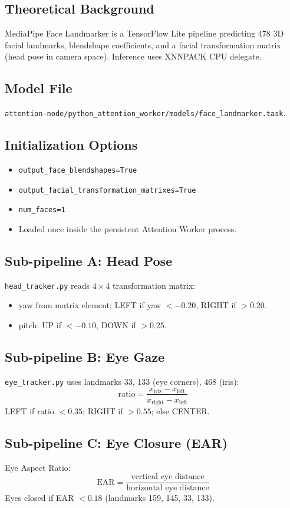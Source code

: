 \documentclass[11pt,a4paper]{report}
\begin{document}
\subsection{Theoretical Background}
MediaPipe Face Landmarker is a TensorFlow Lite pipeline predicting 478 3D facial landmarks, blendshape coefficients, and a facial transformation matrix (head pose in camera space). Inference uses XNNPACK CPU delegate.

\subsection{Model File}
\texttt{attention-node/python\_attention\_worker/models/face\_landmarker.task}.

\subsection{Initialization Options}
\begin{itemize}
  \item \texttt{output\_face\_blendshapes=True}
  \item \texttt{output\_facial\_transformation\_matrixes=True}
  \item \texttt{num\_faces=1}
  \item Loaded once inside the persistent Attention Worker process.
\end{itemize}

\subsection{Sub-pipeline A: Head Pose}
\texttt{head\_tracker.py} reads $4 \times 4$ transformation matrix:
\begin{itemize}
  \item yaw from matrix element; LEFT if yaw $< -0.20$, RIGHT if $> 0.20$.
  \item pitch: UP if $< -0.10$, DOWN if $> 0.25$.
\end{itemize}

\subsection{Sub-pipeline B: Eye Gaze}
\texttt{eye\_tracker.py} uses landmarks 33, 133 (eye corners), 468 (iris):
\[
\text{ratio} = \frac{x_{\text{iris}} - x_{\text{left}}}{x_{\text{right}} - x_{\text{left}}}
\]
LEFT if ratio $< 0.35$; RIGHT if $> 0.55$; else CENTER.

\subsection{Sub-pipeline C: Eye Closure (EAR)}
Eye Aspect Ratio:
\[
\text{EAR} = \frac{\text{vertical eye distance}}{\text{horizontal eye distance}}
\]
Eyes closed if EAR $< 0.18$ (landmarks 159, 145, 33, 133).
\end{document}
